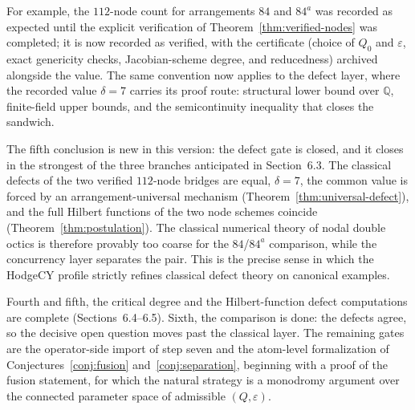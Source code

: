 
For example, the $112$-node count for arrangements $84$ and $84^{a}$ was
recorded as expected until the explicit verification of
Theorem~\ref{thm:verified-nodes} was completed; it is now recorded as
verified, with the certificate (choice of $Q_0$ and $\varepsilon$, exact
genericity checks, Jacobian-scheme degree, and reducedness) archived
alongside the value. The same convention now applies to the defect layer,
where the recorded value $\delta = 7$ carries its proof route: structural
lower bound over $\mathbb{Q}$, finite-field upper bounds, and the
semicontinuity inequality that closes the sandwich.


The fifth conclusion is new in this version: the defect gate is closed, and
it closes in the strongest of the three branches anticipated in
Section~6.3. The classical defects of the two verified $112$-node bridges
are equal, $\delta = 7$, the common value is forced by an
arrangement-universal mechanism (Theorem~\ref{thm:universal-defect}), and
the full Hilbert functions of the two node schemes coincide
(Theorem~\ref{thm:postulation}). The classical numerical theory of nodal
double octics is therefore provably too coarse for the $84$/$84^{a}$
comparison, while the concurrency layer separates the pair. This is the
precise sense in which the HodgeCY profile strictly refines classical
defect theory on canonical examples.


Fourth and fifth, the critical degree and the Hilbert-function defect
computations are complete (Sections~6.4--6.5). Sixth, the comparison is
done: the defects agree, so the decisive open question moves past the
classical layer. The remaining gates are the operator-side import of
step seven and the atom-level formalization of
Conjectures~\ref{conj:fusion} and~\ref{conj:separation}, beginning with a
proof of the fusion statement, for which the natural strategy is a
monodromy argument over the connected parameter space of admissible
$(Q, \varepsilon)$.


